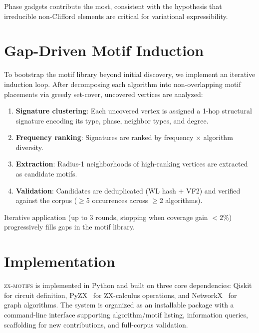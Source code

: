 \documentclass[twocolumn,prl,amsmath,amssymb,superscriptaddress]{revtex4-2}
\newcommand{\zxmotifs}{\textsc{zx-motifs}}
\begin{document}
Phase gadgets contribute the most, consistent with the hypothesis that irreducible non-Clifford elements are critical for variational expressibility.

\section{Gap-Driven Motif Induction}
\label{sec:induction}

To bootstrap the motif library beyond initial discovery, we implement an iterative induction loop.
After decomposing each algorithm into non-overlapping motif placements via greedy set-cover, uncovered vertices are analyzed:

\begin{enumerate}
    \item \textbf{Signature clustering}: Each uncovered vertex is assigned a 1-hop structural signature encoding its type, phase, neighbor types, and degree.
    \item \textbf{Frequency ranking}: Signatures are ranked by frequency $\times$ algorithm diversity.
    \item \textbf{Extraction}: Radius-1 neighborhoods of high-ranking vertices are extracted as candidate motifs.
    \item \textbf{Validation}: Candidates are deduplicated (WL hash + VF2) and verified against the corpus ($\geq$5 occurrences across $\geq$2 algorithms).
\end{enumerate}

Iterative application (up to 3 rounds, stopping when coverage gain $< 2\%$) progressively fills gaps in the motif library.

\section{Implementation}
\label{sec:implementation}

\zxmotifs{} is implemented in Python and built on three core dependencies: Qiskit~\cite{Qiskit2024} for circuit definition, PyZX~\cite{Kissinger2020} for ZX-calculus operations, and NetworkX~\cite{Hagberg2008} for graph algorithms.
The system is organized as an installable package with a command-line interface supporting algorithm/motif listing, information queries, scaffolding for new contributions, and full-corpus validation.
\end{document}
